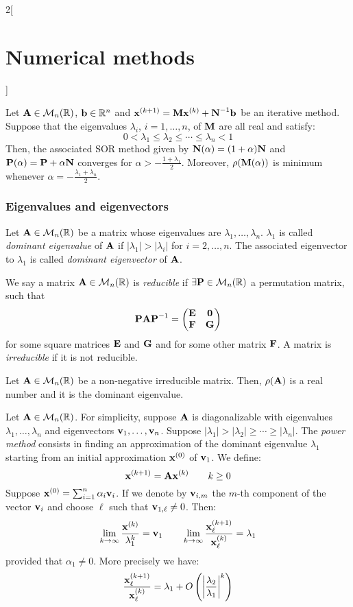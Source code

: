 \documentclass[../../../main.tex]{subfiles}
\begin{document}
\begin{multicols}{2}[\section{Numerical methods}]
  \begin{theorem}
    Let $\boldsymbol{\mathrm{A}}\in\mathcal{M}_n(\mathbb{R})$, $\boldsymbol{\mathrm{b}}\in\mathbb{R}^n$ and $\boldsymbol{\mathrm{x}}^{(k+1)}=\boldsymbol{\mathrm{M}}\boldsymbol{\mathrm{x}}^{(k)}+\boldsymbol{\mathrm{N}}^{-1}\boldsymbol{\mathrm{b}}$ be an iterative method. Suppose that the eigenvalues $\lambda_i$, $i=1,\ldots,n$, of $\boldsymbol{\mathrm{M}}$ are all real and satisfy: $$0<\lambda_1\leq\lambda_2\leq\cdots\leq\lambda_n<1$$
    Then, the associated SOR method given by $\boldsymbol{\mathrm{N}}(\alpha)=(1+\alpha)\boldsymbol{\mathrm{N}}$ and $\boldsymbol{\mathrm{P}}(\alpha)=\boldsymbol{\mathrm{P}}+\alpha\boldsymbol{\mathrm{N}}$ converges for $\alpha>-\frac{1+\lambda_1}{2}$. Moreover, $\rho(\boldsymbol{\mathrm{M}}(\alpha))$ is minimum whenever $\alpha=-\frac{\lambda_1+\lambda_n}{2}$.
  \end{theorem}
  \subsubsection{Eigenvalues and eigenvectors}
  \begin{definition}
    Let $\boldsymbol{\mathrm{A}}\in\mathcal{M}_n(\mathbb{R})$ be a matrix whose eigenvalues are $\lambda_1,\ldots,\lambda_n$. $\lambda_1$ is called \emph{dominant eigenvalue} of $\boldsymbol{\mathrm{A}}$ if $|\lambda_1|>|\lambda_i|$ for $i=2,\ldots,n$. The associated eigenvector to $\lambda_1$ is called \emph{dominant eigenvector} of $\boldsymbol{\mathrm{A}}$.
  \end{definition}
  \begin{definition}
    We say a matrix $\boldsymbol{\mathrm{A}}\in\mathcal{M}_n(\mathbb{R})$ is \emph{reducible} if $\exists\boldsymbol{\mathrm{P}}\in\mathcal{M}_n(\mathbb{R})$ a permutation matrix, such that $$\boldsymbol{\mathrm{P}}\boldsymbol{\mathrm{A}}\boldsymbol{\mathrm{P}}^{-1}=
      \begin{pmatrix}
        \boldsymbol{\mathrm{E}} & \boldsymbol{\mathrm{0}} \\
        \boldsymbol{\mathrm{F}} & \boldsymbol{\mathrm{G}}
      \end{pmatrix}$$ for some square matrices $\boldsymbol{\mathrm{E}}$ and $\boldsymbol{\mathrm{G}}$ and for some other matrix $\boldsymbol{\mathrm{F}}$. A matrix is \emph{irreducible} if it is not reducible.
  \end{definition}
  \begin{theorem}
    Let $\boldsymbol{\mathrm{A}}\in\mathcal{M}_n(\mathbb{R})$ be a non-negative irreducible matrix. Then, $\rho(\boldsymbol{\mathrm{A}})$ is a real number and it is the dominant eigenvalue.
  \end{theorem}
  \begin{method}
    Let $\boldsymbol{\mathrm{A}}\in\mathcal{M}_n(\mathbb{R})$. For simplicity, suppose $\boldsymbol{\mathrm{A}}$ is diagonalizable with eigenvalues $\lambda_1,\ldots,\lambda_n$ and eigenvectors $\boldsymbol{\mathrm{v}}_1,\ldots,\boldsymbol{\mathrm{v}}_n$. Suppose $|\lambda_1|>|\lambda_2|\geq\cdots\geq|\lambda_n|$. The \emph{power method} consists in finding an approximation of the dominant eigenvalue $\lambda_1$ starting from an initial approximation $\boldsymbol{\mathrm{x}}^{(0)}$ of $\boldsymbol{\mathrm{v}}_1$. We define: $$\boldsymbol{\mathrm{x}}^{(k+1)}=\boldsymbol{\mathrm{A}}\boldsymbol{\mathrm{x}}^{(k)}\qquad k\geq 0$$ Suppose $\boldsymbol{\mathrm{x}}^{(0)}=\sum_{i=1}^n\alpha_i\boldsymbol{\mathrm{v}}_i$. If we denote by $\boldsymbol{\mathrm{v}}_{i,m}$ the $m$-th component of the vector $\boldsymbol{\mathrm{v}}_i$ and choose $\ell$ such that $\boldsymbol{\mathrm{v}}_{1,\ell}\ne0$. Then: $$\lim_{k\to\infty}\frac{\boldsymbol{\mathrm{x}}^{(k)}}{\lambda_1^k}=\boldsymbol{\mathrm{v}}_1\qquad\lim_{k\to\infty}\frac{\boldsymbol{\mathrm{x}}_\ell^{(k+1)}}{\boldsymbol{\mathrm{x}}_\ell^{(k)}}=\lambda_1$$ provided that $\alpha_1\ne0$. More precisely we have: $$\frac{\boldsymbol{\mathrm{x}}_\ell^{(k+1)}}{\boldsymbol{\mathrm{x}}_\ell^{(k)}}=\lambda_1+O\left(\left|\frac{\lambda_2}{\lambda_1}\right|^k\right)$$

\end{method}
\end{multicols}
\end{document}
